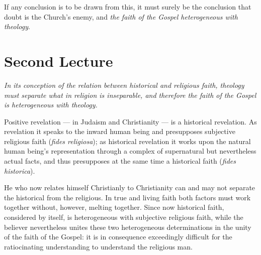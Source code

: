 \documentclass[12pt,a4paper]{book}
\begin{document}
If any conclusion is to be drawn from this, it must surely be the conclusion
that doubt is the Church's enemy, and \emph{the faith of the Gospel
heterogeneous with theology}.

\chapter*{Second Lecture}
\label{ch:forel2}

\begin{center}\itshape
In its conception of the relation between historical and religious faith,
theology must separate what in religion is inseparable, and therefore the
faith of the Gospel is heterogeneous with theology.
\end{center}

Positive revelation --- in Judaism and Christianity --- is a historical
revelation. As revelation it speaks to the inward human being and presupposes
subjective religious faith (\textit{fides religiosa}); as historical revelation
it works upon the natural human being's representation through a complex of
supernatural but nevertheless actual facts, and thus presupposes at the same
time a historical faith (\textit{fides historica}).

He who now relates himself Christianly to Christianity can and may not separate
the historical from the religious. In true and living faith both factors must
work together without, however, melting together. Since now historical faith,
considered by itself, is heterogeneous with subjective religious faith, while
the believer nevertheless unites these two heterogeneous determinations in the
unity of the faith of the Gospel: it is in consequence exceedingly difficult
for the ratiocinating understanding to understand the religious man.
\end{document}
